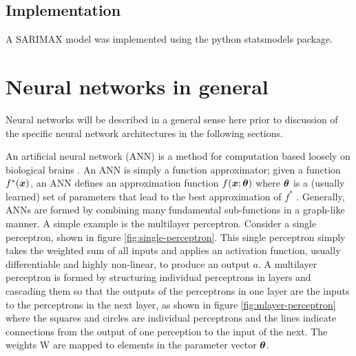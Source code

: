 \subsection{Implementation}
A SARIMAX model was implemented using the python statsmodels package.


\section{Neural networks in general}
Neural networks will be described in a general sense here prior to discussion of the specific neural network architectures in the following sections.

An artificial neural network (ANN) is a method for computation based loosely on biological brains \citep{negnevitsky2005artificial}.
An ANN is simply a function approximator; given a function $f^*({\bm{x}})$, an ANN defines an approximation function $f({\bm{x}}; {\bm{\theta}})$ where ${\bm{\theta}}$ is a (usually learned) set of parameters that lead to the best approximation of $f^*$ \citep{Goodfellow-et-al-2016}. 
Generally, ANNs are formed by combining many fundamental sub-functions in a graph-like manner. 
A simple example is the multilayer perceptron.
Consider a single perceptron, shown in figure \ref{fig:single-perceptron}.
This single perceptron simply takes the weighted sum of all inputs and applies an activation function, usually differentiable and highly non-linear, to produce an output $a$.
A multilayer perceptron is formed by structuring individual perceptrons in layers and cascading them so that the outputs of the perceptrons in one layer are the inputs to the perceptrons in the next layer, as shown in figure \ref{fig:mlayer-perceptron} where the squares and circles are individual perceptrons and the lines indicate connections from the output of one perception to the input of the next.
The weights W are mapped to elements in the parameter vector ${\bm{\theta}}$.

